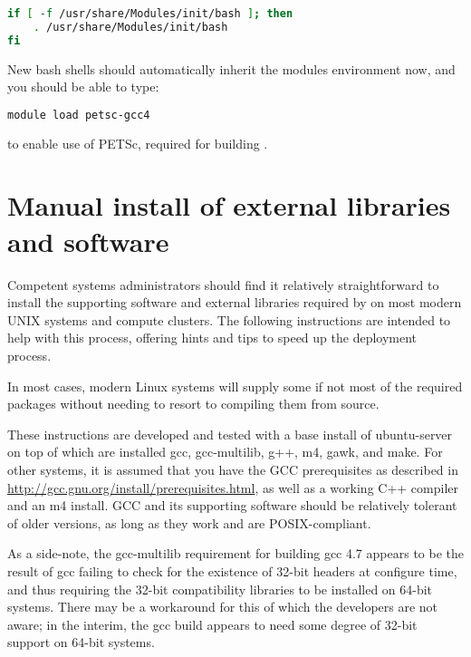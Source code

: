 \begin{lstlisting}[language=bash]
if [ -f /usr/share/Modules/init/bash ]; then
    . /usr/share/Modules/init/bash
fi
\end{lstlisting}

New bash shells should automatically inherit the modules environment now, and
you should be able to type:

\begin{lstlisting}[language=bash]
module load petsc-gcc4
\end{lstlisting}

to enable use of PETSc, required for building \fluidity.
 
\section{Manual install of external libraries and software}
\label{sec:required_ḻibraries_manual_install}

Competent systems administrators should find it relatively straightforward to
install the supporting software and external libraries required by \fluidity on
most modern UNIX systems and compute clusters. The following instructions are
intended to help with this process, offering hints and tips to speed up the
deployment process.

In most cases, modern Linux systems will supply some if not most of the
required packages without needing to resort to compiling them from source.

These instructions are developed and tested with a base install of
ubuntu-server on top of which are installed gcc, gcc-multilib, g++, m4, gawk,
and make. For other systems, it is assumed that you have the GCC prerequisites
as described in \url{http://gcc.gnu.org/install/prerequisites.html}, as well as
a working C++ compiler and an m4 install. GCC and its supporting software
should be relatively tolerant of older versions, as long as they work and are
POSIX-compliant.

As a side-note, the gcc-multilib requirement for building gcc 4.7 appears to be
the result of gcc failing to check for the existence of 32-bit headers at
configure time, and thus requiring the 32-bit compatibility libraries to be
installed on 64-bit systems. There may be a workaround for this of which the
\fluidity developers are not aware; in the interim, the gcc build appears to
need some degree of 32-bit support on 64-bit systems.

